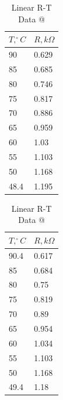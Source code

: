\documentclass[a4,11pt]{article}
\makeatletter
\newcommand*{\rom}[1]{\expandafter\@slowromancap\romannumeral #1@}
\makeatother
\begin{document}
\begin{table}
  \centering
  \caption{Linear R-T Data \rom{2}}
\begin{tabular}{l|l}
  \hline
  $T, ^{\circ}C$ & $R, k\Omega$ \\
  \hline
  90 & 0.629  \\
  85 & 0.685  \\
  80 & 0.746  \\
  75 & 0.817  \\
  70 & 0.886  \\
  65 & 0.959  \\
  60 & 1.03  \\
  55 & 1.103  \\
  50 & 1.168  \\
  48.4 & 1.195  \\
  \hline
\end{tabular}
\end{table}

\begin{table}
  \centering
  \caption{Linear R-T Data \rom{3}}
\begin{tabular}{l|l}
  \hline
  $T, ^{\circ}C$ & $R, k\Omega$ \\
  \hline
  90.4 & 0.617  \\
  85 & 0.684  \\
  80 & 0.75  \\
  75 & 0.819  \\
  70 & 0.89  \\
  65 & 0.954  \\
  60 & 1.034  \\
  55 & 1.103  \\
  50 & 1.168  \\
  49.4 & 1.18  \\
  \hline
\end{tabular}
\end{table}
\end{document}

